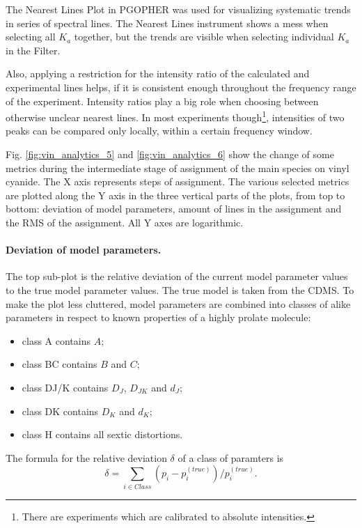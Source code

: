 \documentclass[11pt]{article}
\begin{document}
The Nearest Lines Plot in PGOPHER was used for visualizing systematic trends in series of spectral lines. The Nearest Lines instrument shows a mess when selecting all $K_a$ together, but the trends are visible when selecting individual $K_a$ in the Filter. 

Also, applying a restriction for the intensity ratio of the calculated and experimental lines helps, if it is consistent enough throughout the frequency range of the experiment. Intensity ratios play a big role when choosing between otherwise unclear nearest lines. In most experiments though\footnote{There are experiments which are calibrated to absolute intensities.}, intensities of two peaks can be compared only locally, within a certain frequency window. 

Fig. \ref{fig:vin_analytics_5} and \ref{fig:vin_analytics_6} show the change of some metrics during the intermediate stage of assignment of the main species on vinyl cyanide. The X axis represents steps of assignment. The various selected metrics are plotted along the Y axis in the three vertical parts of the plots, from top to bottom: deviation of model parameters, amount of lines in the assignment and the RMS of the assignment. All Y axes are logarithmic.

\paragraph{Deviation of model parameters.}
    The top sub-plot is the relative deviation of the current model parameter values to the true model parameter values. The true model is taken from the CDMS. To make the plot less cluttered, model parameters are combined into classes of alike parameters in respect to known properties of a highly prolate molecule:
    \begin{itemize}
        \item class A contains $A$;
        \item class BC contains $B$ and $C$;
        \item class DJ/K contains $D_J$, $D_{JK}$ and $d_J$;
        \item class DK contains $D_K$ and $d_K$;
        \item class H contains all sextic distortions.
    \end{itemize}
    The formula for the relative deviation $\delta$ of a class of paramters is
    \begin{equation}
        \delta = \sum_{i \in Class} (p_i - p^{(true)}_i) / p^{(true)}_i.
    \end{equation}
    
\end{document}

